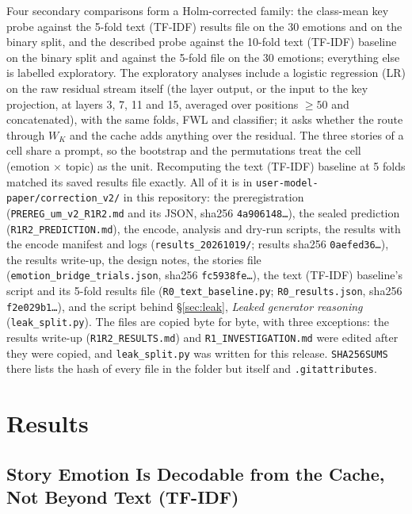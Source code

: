 Four secondary comparisons form a Holm-corrected family: the class-mean key probe against the 5-fold text (TF-IDF) results file on the 30 emotions and on the binary split, and the described probe against the 10-fold text (TF-IDF) baseline on the binary split and against the 5-fold file on the 30 emotions; everything else is labelled exploratory. The exploratory analyses include a logistic regression (LR) on the raw residual stream itself (the layer output, or the input to the key projection, at layers 3, 7, 11 and 15, averaged over positions $\geq 50$ and concatenated), with the same folds, FWL and classifier; it asks whether the route through $W_K$ and the cache adds anything over the residual. The three stories of a cell share a prompt, so the bootstrap and the permutations treat the cell (emotion $\times$ topic) as the unit. Recomputing the text (TF-IDF) baseline at 5 folds matched its saved results file exactly. All of it is in \texttt{user-model-paper/correction\_v2/} in this repository: the preregistration (\texttt{PREREG\_um\_v2\_R1R2.md} and its JSON, sha256 \texttt{4a906148\ldots}), the sealed prediction (\texttt{R1R2\_PREDICTION.md}), the encode, analysis and dry-run scripts, the results with the encode manifest and logs (\texttt{results\_20261019/}; results sha256 \texttt{0aefed36\ldots}), the results write-up, the design notes, the stories file (\texttt{emotion\_bridge\_trials.json}, sha256 \texttt{fc5938fe\ldots}), the text (TF-IDF) baseline's script and its 5-fold results file (\texttt{R0\_text\_baseline.py}; \texttt{R0\_results.json}, sha256 \texttt{f2e029b1\ldots}), and the script behind \S\ref{sec:leak}, \emph{Leaked generator reasoning} (\texttt{leak\_split.py}). The files are copied byte for byte, with three exceptions: the results write-up (\texttt{R1R2\_RESULTS.md}) and \texttt{R1\_INVESTIGATION.md} were edited after they were copied, and \texttt{leak\_split.py} was written for this release. \texttt{SHA256SUMS} there lists the hash of every file in the folder but itself and \texttt{.gitattributes}.

\section{Results}

\subsection{Story Emotion Is Decodable from the Cache, Not Beyond Text (TF-IDF)}
\label{sec:wk_results}

